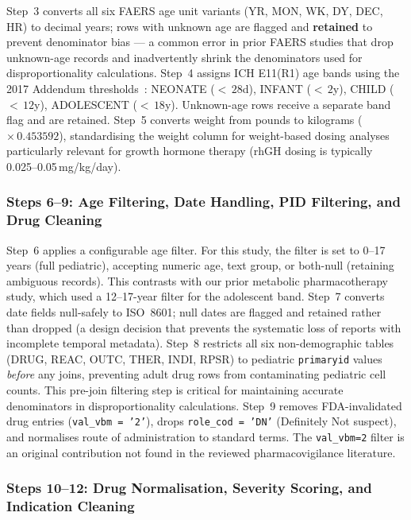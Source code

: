 \documentclass[10pt,twocolumn]{article}
\newcommand{\FAERS}{\textsf{FAERS}\xspace}
\begin{document}
Step~3 converts all six \FAERS age unit variants (YR, MON, WK, DY, DEC, HR) to decimal years; rows with unknown age are flagged and \textbf{retained} to prevent denominator bias --- a common error in prior FAERS studies that drop unknown-age records and inadvertently shrink the denominators used for disproportionality calculations. Step~4 assigns ICH E11(R1) age bands using the 2017 Addendum thresholds~\cite{ich2017}: NEONATE ($<\,28$d), INFANT ($<\,2$y), CHILD ($<\,12$y), ADOLESCENT ($<\,18$y). Unknown-age rows receive a separate band flag and are retained. Step~5 converts weight from pounds to kilograms ($\times\,0.453592$), standardising the weight column for weight-based dosing analyses particularly relevant for growth hormone therapy (rhGH dosing is typically 0.025--0.05\,mg/kg/day).
 
\subsubsection{Steps 6--9: Age Filtering, Date Handling, PID Filtering, and Drug Cleaning}
 
Step~6 applies a configurable age filter. For this study, the filter is set to 0--17 years (full pediatric), accepting numeric age, text group, or both-null (retaining ambiguous records). This contrasts with our prior metabolic pharmacotherapy study, which used a 12--17-year filter for the adolescent band. Step~7 converts date fields null-safely to ISO~8601; null dates are flagged and retained rather than dropped (a design decision that prevents the systematic loss of reports with incomplete temporal metadata). Step~8 restricts all six non-demographic tables (DRUG, REAC, OUTC, THER, INDI, RPSR) to pediatric \texttt{primaryid} values \emph{before} any joins, preventing adult drug rows from contaminating pediatric cell counts. This pre-join filtering step is critical for maintaining accurate denominators in disproportionality calculations. Step~9 removes FDA-invalidated drug entries (\texttt{val\_vbm\,=\,'2'}), drops \texttt{role\_cod\,=\,'DN'} (Definitely Not suspect), and normalises route of administration to standard terms. The \texttt{val\_vbm=2} filter is an original contribution not found in the reviewed pharmacovigilance literature.
 
\subsubsection{Steps 10--12: Drug Normalisation, Severity Scoring, and Indication Cleaning}
 
\end{document}
